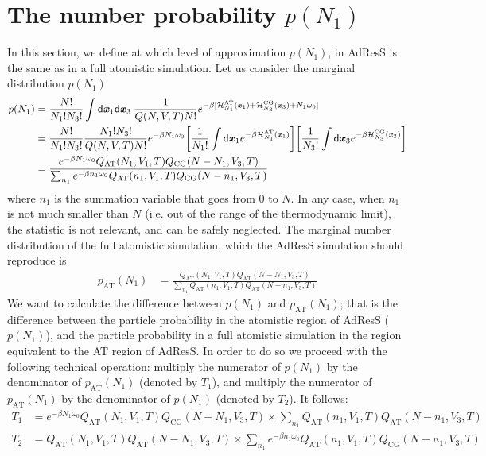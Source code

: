 \documentclass[aip,jcp,a4paper,reprint,onecolumn]{revtex4-1}
\newcommand{\vect}[1]{\textbf{\textit{#1}}}
\newcommand{\dd}[1]{\textsf{#1}}
\newcommand{\AT}{{\textrm{{AT}}}}
\newcommand{\CG}{{\textrm{CG}}}
\begin{document}
\appendix

\section{The number probability $p(N_1)$}\label{app:1}
In this section, we define at which level of approximation $p(N_{1})$, in AdResS is the same as in a full atomistic simulation. 
Let us consider the marginal distribution $p(N_1)$
\begin{align}\nonumber
  p(N_1)
  &=
  \frac{N!}{N_1!N_3!}
  \int
  \dd d\vect x_1\dd d\vect x_3  \:
  \frac{1}{Q(N,V,T) N!}
  e^{-\beta
    [\mathcal H_{N_1}^{\AT}(\vect x_1) +
    \mathcal H_{N_3}^{\CG}(\vect x_3) +
    N_1\omega_0]}\\\nonumber
  &=
  \frac{N!}{N_1!N_3!}
  \frac{N_1!N_3!}{Q(N,V,T) N!}
  e^{-\beta N_1\omega_0}
  \bigg[
  \frac1{N_1!}
  \int
  \dd d\vect x_1
  e^{-\beta \mathcal H_{N_1}^{\AT}(\vect x_1)}
  \bigg]
  \bigg[
  \frac1{N_3!}
  \int
  \dd d\vect x_3
  e^{-\beta \mathcal H_{N_3}^{\CG}(\vect x_3)}
  \bigg]  \\\label{eqn:pn1}
  &=
  \frac
  {
    e^{-\beta N_1\omega_0}
    Q_{\AT}(N_1,V_1,T) Q_{\CG}(N-N_1,V_3,T)
  }
  {
    \sum_{n_1}
    e^{-\beta n_1\omega_0}
    Q_{\AT}(n_1,V_1,T) Q_{\CG}(N-n_1,V_3,T)
  }
\end{align}
where $n_1$ is the summation variable that goes from 0 to $N$.
In any case, when $n_1$ is not much smaller than $N$ (i.e. out of the range of the
thermodynamic limit), the statistic is not relevant,
and can be safely neglected.
The marginal number distribution of the full atomistic simulation,
which the AdResS simulation should
reproduce is
\begin{align}
  p_{\AT}(N_1)
  &=
  \frac
  {
    Q_{\AT}(N_1,V_1,T) Q_{\AT}(N-N_1,V_3,T)
  }
  {
    \sum_{n_1}
    Q_{\AT}(n_1,V_1,T) Q_{\AT}(N-n_1,V_3,T)
  }  
\end{align}
We want to calculate the difference between $p(N_1)$ and $p_{\AT}(N_1)$; that is the difference between the particle probability in the atomistic region of AdResS ($p(N_{1})$), and the particle probability in a full atomistic simulation in the region equivalent to the AT region of AdResS.
In order to do so we proceed with the following technical operation: multiply the numerator of $p(N_1)$ by the denominator of
$p_{\AT}(N_1)$ (denoted by $T_1$),
and multiply the numerator of $p_{\AT}(N_1)$
by the denominator of $p(N_1)$ (denoted by $T_2$). It follows:
\begin{align}
  T_1
  &=
  e^{-\beta N_1\omega_0}
  Q_{\AT}(N_1,V_1,T) Q_{\CG}(N-N_1,V_3,T)
  \times
  \sum_{n_1}
  Q_{\AT}(n_1,V_1,T) Q_{\AT}(N-n_1,V_3,T)\\
  T_2
  &=
  Q_{\AT}(N_1,V_1,T) Q_{\AT}(N-N_1,V_3,T)
  \times
  \sum_{n_1}
  e^{-\beta n_1\omega_0}
  Q_{\AT}(n_1,V_1,T) Q_{\CG}(N-n_1,V_3,T)
\end{align}
\end{document}
